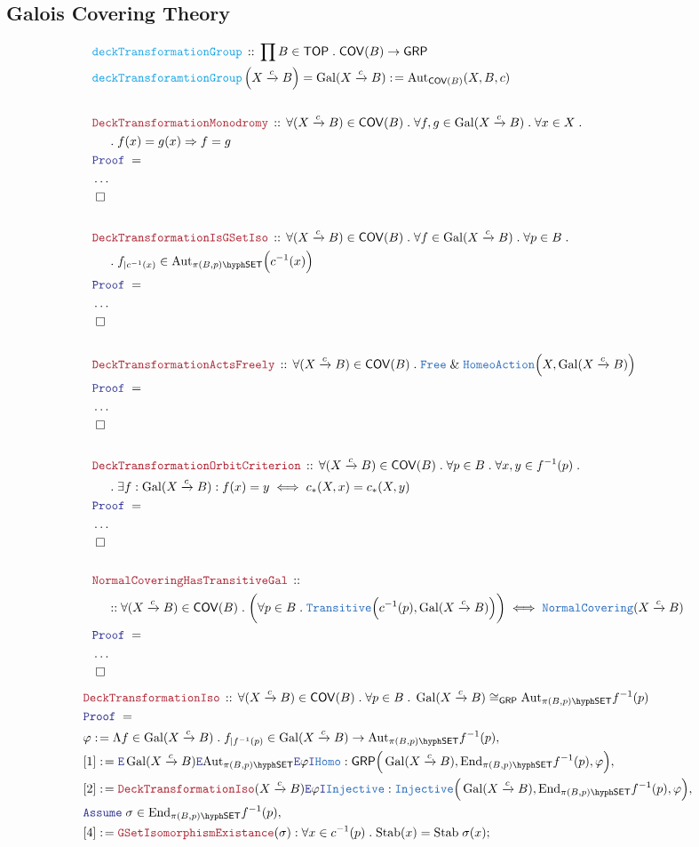 \documentclass[12pt]{scrartcl}
\newcommand{\TYPE}[1]{\textcolor{NavyBlue}{\mathtt{#1}}}
\newcommand{\FUNC}[1]{\textcolor{Cerulean}{\mathtt{#1}}}
\newcommand{\LOGIC}[1]{\textcolor{Blue}{\mathtt{#1}}}
\newcommand{\THM}[1]{\textcolor{Maroon}{\mathtt{#1}}}
\renewcommand{\.}{\; . \;}
\newcommand{\de}{: \kern 0.1pc =}
\newcommand{\Act}[1]{\left( #1 \right)}
\newcommand{\Theorem}[2]{& \THM{#1} \, :: \, #2 \\ & \Proof = \\ }
\newcommand{\DeclareFunc}[2]{& \FUNC{#1} \, :: \, #2 \\}
\newcommand{\DefineNamedFunc}[4]{&  \FUNC{#1}\Act{#2} = #3 \de #4 \\}
\newcommand{\NewLine}{\\ & \kern 1pc}
\newcommand{\Page}[1]{ \begin{align*} #1 \end{align*}   }
\newcommand{\NoProof}{ & \ldots \\ \EndProof}
\renewcommand{\And}{\; \& \;}
\newcommand{\Imply}{\Rightarrow}
\newcommand{\Intro}{\LOGIC{I}}
\newcommand{\Elim}{\LOGIC{E}}
\newcommand{\End}{\mathrm{End}}
\newcommand{\Aut}{\mathrm{Aut}}
\newcommand{\Arrow}{\xrightarrow}
\newcommand{\Say}[3]{& #1 \de #2 : #3, \\}
\newcommand{\SayIn}[3]{& #1 \de #2 \in #3, \\}
\newcommand{\Conclude}[3]{& #1 \de #2 : #3; \\}
\newcommand{\AssumeIn}[2]{& \LOGIC{Assume} \; #1 \in #2, \\}
\newcommand{\QED}{\; \square}
\newcommand{\EndProof}{& \QED \\}
\newcommand{\Proof}{\LOGIC{Proof} \; }
\newcommand{\SET}{\mathsf{SET}}
\newcommand{\TOP}{\mathsf{TOP}}
\newcommand{\Stab}{\mathrm{Stab}}
\newcommand{\GRP}{\mathsf{GRP}}
\DeclareMathOperator{\Gal}{Gal}
\newcommand{\COV}{\mathsf{COV}}
\begin{document}
\subsection{Galois Covering Theory}
\Page{
	\DeclareFunc{deckTransformationGroup}
	{
		\prod B \in \TOP \. \COV(B) \to \GRP
	}
	\DefineNamedFunc{deckTransforamtionGroup}{X \Arrow{c} B}
	{
		\Gal(X \Arrow{c} B)
	}
	{
		\Aut_{\COV(B)}(X,B,c)
	}
	\\
	\Theorem{DeckTransformationMonodromy}
	{
		\forall (X \Arrow{c} B) \in \COV(B) \.
		\forall  f,g \in \Gal(X \Arrow{c} B ) \.
		\forall x \in X \. \NewLine \.
		f(x) = g(x) \Imply f = g
	}
	\NoProof
	\\
	\Theorem{DeckTransformationIsGSetIso}
	{
		\forall (X \Arrow{c} B) \in \COV(B) \. 
		\forall f \in \Gal(X \Arrow{c} B) \.
		\forall p \in B \. \NewLine \. 
		f_{|c^{-1}(x)}  \in \Aut_{\pi(B,p)\hyph\SET}\Big(c^{-1}(x)\Big)   
	}
	\NoProof
	\\
	\Theorem{DeckTransformationActsFreely}
	{
		\forall (X \Arrow{c} B) \in \COV(B) \.
		\TYPE{Free} \And\TYPE{HomeoAction}\Big(X, \Gal(X \Arrow{c} B) \Big)
	}
	\NoProof
	\\
	\Theorem{DeckTransformationOrbitCriterion}
	{
		\forall (X \Arrow{c} B) \in \COV(B) \.
		\forall p \in B \. 
		\forall x,y \in f^{-1}(p) \. \NewLine \. 
		\exists f : \Gal(X \Arrow{c} B) : f(x) = y 
		\iff
		c_* (X,x) = c_* (X, y)
	}
	\NoProof
	\\
	\Theorem{NormalCoveringHasTransitiveGal}
	{
		\NewLine ::
		\forall (X \Arrow{c} B) \in \COV(B) \.
		\bigg( \forall p \in B \. \TYPE{Transitive}\Big( c^{-1}(p) , \Gal(X \Arrow{c} B)  \Big)  \bigg)
		\iff
		\TYPE{NormalCovering}(X \Arrow{c} B)
	}
	\NoProof
}\Page{
	\Theorem{DeckTransformationIso}
	{
		\forall (X \Arrow{c} B) \in \COV(B) \.
		\forall p \in B \. 
		\Gal(X \Arrow{c} B) \cong_{\GRP} \Aut_{\pi(B,p)\hyph\SET} f^{-1}(p)
	}
	\SayIn{\varphi}{\Lambda f \in \Gal(X \Arrow{c} B) \. f_{|f^{-1}(p)}}
	{
		\Gal(X \Arrow{c} B) \to \Aut_{\pi(B,p)\hyph\SET} f^{-1}(p)
	}
	\Say{[1]}{\Elim \Gal(X \Arrow{c} B) \Elim \Aut_{\pi(B,p)\hyph\SET} \Elim \varphi \Intro \TYPE{Homo}}
	{
		\GRP\Big( \Gal(X \Arrow{c} B), \End_{\pi(B,p)\hyph\SET} f^{-1}(p), \varphi \Big)
	}
	\Say{[2]}{\THM{DeckTransformationIso}(X \Arrow{c} B) \Elim \varphi \Intro \TYPE{Injective}}
	{
		\TYPE{Injective}\Big( \Gal(X \Arrow{c} B), \End_{\pi(B,p)\hyph\SET} f^{-1}(p), \varphi \Big)
	}
	\AssumeIn{\sigma}{\End_{\pi(B,p)\hyph\SET} f^{-1}(p)}
	\Conclude{[4]}{\THM{GSetIsomorphismExistance}(\sigma)}
	{
		\forall x \in c^{-1}(p) \.
		\Stab(x) = \Stab \; \sigma(x)
}}
\end{document}
